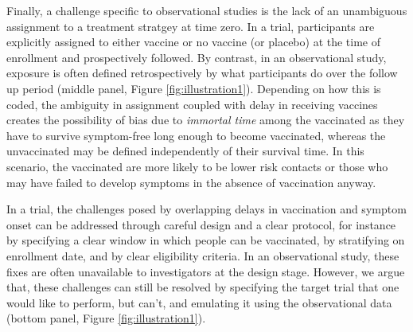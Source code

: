 \documentclass[11pt]{article}
\begin{document}
Finally, a challenge specific to observational studies is the lack of an unambiguous assignment to a treatment stratgey at time zero. In a trial, participants are explicitly assigned to either vaccine or no vaccine (or placebo) at the time of enrollment and prospectively followed. By contrast, in an observational study, exposure is often defined retrospectively by what participants do over the follow up period (middle panel, Figure \ref{fig:illustration1}). Depending on how this is coded, the ambiguity in assignment coupled with delay in receiving vaccines creates the possibility of bias due to \textit{immortal time} among the vaccinated as they have to survive symptom-free long enough to become vaccinated, whereas the unvaccinated may be defined independently of their survival time. In this scenario, the vaccinated are more likely to be lower risk contacts or those who may have failed to develop symptoms in the absence of vaccination anyway. 

In a trial, the challenges posed by overlapping delays in vaccination and symptom onset can be addressed through careful design and a clear protocol, for instance by specifying a clear window in which people can be vaccinated, by stratifying on enrollment date, and by clear eligibility criteria. In an observational study, these fixes are often unavailable to investigators at the design stage. However, we argue that, these challenges can still be resolved by specifying the target trial that one would like to perform, but can't, and emulating it using the observational data (bottom panel, Figure \ref{fig:illustration1}).
\end{document}

